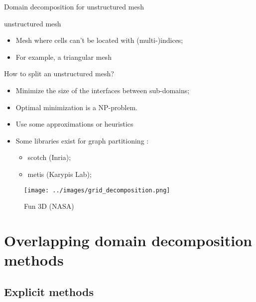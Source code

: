 \documentclass[compress,10pt,aspectratio=169]{beamer}
\begin{document}
\begin{frame}[fragile]{Domain decomposition for unstructured mesh}
    \scriptsize

    \begin{multicols}{2}
    \begin{block}{\small unstructured mesh}
        \begin{itemize}
            \item Mesh where cells can't be located with (multi-)indices;
            \item For example, a triangular mesh
        \end{itemize}
    \end{block}

    \begin{exampleblock}{\small How to split an unstructured mesh?}
        \begin{itemize}
            \item Minimize the size of the interfaces between sub-domains;
            \item Optimal minimization is a NP-problem. 
            \item Use some approximations or heuristics
            \item Some libraries exist for graph partitioning :
            \begin{itemize}
                \item {\scriptsize scotch (Inria);}
                \item {\scriptsize metis (Karypis Lab)};
            \end{itemize}
        \end{itemize}
    \end{exampleblock}

    \begin{figure}[h]
    \texttt{[image: ../images/grid\_decomposition.png]}
    \caption{Fun 3D (NASA)}
    \end{figure}
\end{multicols}
\end{frame}

\section{Overlapping domain decomposition methods}



\subsection{Explicit methods}
\end{document}
